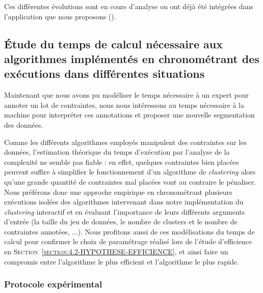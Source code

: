 			\begin{leftBarInformation}
				Ces différentes évolutions sont en cours d'analyse ou ont déjà été intégrées dans l'application que nous proposons (\cite{schild-etal:2022:cognitivefactory-interactiveclusteringgui}).
			\end{leftBarInformation}
	

	\subsection{Étude du temps de calcul nécessaire aux algorithmes implémentés en chronométrant des exécutions dans différentes situations}
	\label{section:4.3.2-ETUDE-COUTS-TEMPS-CALCUL}
		
		Maintenant que nous avons pu modéliser le temps nécessaire à un expert pour annoter un lot de contraintes, nous nous intéressons au temps nécessaire à la machine pour interpréter ces annotations et proposer une nouvelle segmentation des données.
		
		Comme les différents algorithmes employés manipulent des contraintes sur les données, l'estimation théorique du temps d'exécution par l'analyse de la complexité ne semble pas fiable : en effet, quelques contraintes bien placées peuvent suffire à simplifier le fonctionnement d'un algorithme de \textit{clustering} alors qu'une grande quantité de contraintes mal placées vont au contraire le pénaliser.
		Nous préférons donc une approche empirique en chronométrant plusieurs exécutions isolées des algorithmes intervenant dans notre implémentation du \textit{clustering} interactif et en évaluant l'importance de leurs différents arguments d'entrée (la taille du jeu de données, le nombre de clusters et le nombre de contraintes annotées, ...).
		Nous profitons aussi de ces modélisations du temps de calcul pour confirmer le choix de paramétrage réalisé lors de l'étude d'efficience en \textsc{Section~\ref{section:4.2-HYPOTHESE-EFFICIENCE}}, et ainsi faire un compromis entre l'algorithme le plus efficient et l'algorithme le plus rapide.
	
		\subsubsection{Protocole expérimental}
			
